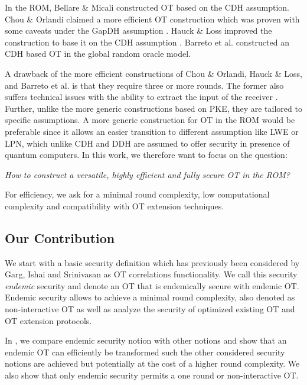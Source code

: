 In the ROM, Bellare \& Micali \cite{C:BelMic89} constructed OT based on the CDH assumption. Chou \& Orlandi \cite{LC:ChoOrl15} claimed a more efficient OT construction which was proven with some caveats under the GapDH assumption \cite{cryptoeprint:2017:1011}. Hauck \& Loss improved the construction to base it on the CDH assumption \cite{cryptoeprint:2017:1011}. Barreto et al. \cite{EPRINT:BDDMN17b} constructed an CDH based OT in the global random oracle model.  

A drawback of the more efficient constructions of Chou \& Orlandi, Hauck \& Loss, and Barreto et al. is that they require three or more rounds. The former also suffers technical issues with the ability to extract the input of the receiver \cite{LC:ChoOrl15}. Further, unlike the more generic constructions based on PKE, they are tailored to specific assumptions. A more generic construction for OT in the ROM would be preferable since it allows an easier transition to different assumption like LWE or LPN, which unlike CDH and DDH are assumed to offer security in presence of quantum computers. In this work, we therefore want to focus on the question:

\begin{center}
\emph{How to construct a versatile, highly efficient and fully secure OT in the ROM?}
\end{center}

For efficiency, we ask for a minimal round complexity, low computational complexity and compatibility with OT extension techniques.

\subsection{Our Contribution}

We start with a basic security definition which has previously been considered by Garg, Ishai and Srinivasan \cite{TCC:GarIshSri18} as OT correlations functionality. We call this security \emph{endemic} security and denote an OT that is endemically secure with endemic OT. Endemic security allows to achieve a minimal round complexity, also denoted as non-interactive OT \cite{C:BelMic89,TCC:GarIshSri18} as well as analyze the security of optimized existing OT and OT extension protocols.

In , we compare endemic security notion with other notions and show that an endemic OT can efficiently  be transformed such the other considered security notions are achieved but potentially at the cost of a higher round complexity. We also show that  only endemic security permits a one round or non-interactive OT.

